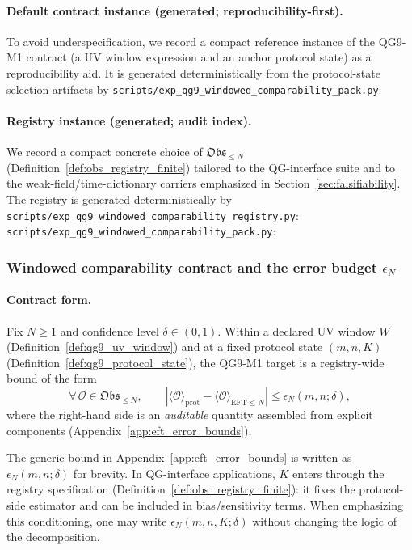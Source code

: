 \paragraph{Default contract instance (generated; reproducibility-first).}
\AuditTag To avoid underspecification, we record a compact reference instance of the QG9-M1 contract (a UV window expression and an anchor protocol state)
as a reproducibility aid. It is generated deterministically from the protocol-state selection artifacts by
\texttt{scripts/exp\_qg9\_windowed\_comparability\_pack.py}:


\paragraph{Registry instance (generated; audit index).}
\AuditTag We record a compact concrete choice of $\mathfrak{Obs}_{\le N}$ (Definition~\ref{def:obs_registry_finite}) tailored to the QG-interface suite
and to the weak-field/time-dictionary carriers emphasized in Section~\ref{sec:falsifiability}.
The registry is generated deterministically by \texttt{scripts/exp\_qg9\_windowed\_comparability\_registry.py}:
\texttt{scripts/exp\_qg9\_windowed\_comparability\_pack.py}:


\subsubsection{Windowed comparability contract and the error budget \texorpdfstring{$\epsilon_N$}{epsilonN}}
\label{subsec:qg9_m1_contract}

\paragraph{Contract form.}
\MathTag Fix $N\ge 1$ and confidence level $\delta\in(0,1)$.
Within a declared UV window $W$ (Definition~\ref{def:qg9_uv_window}) and at a fixed protocol state $(m,n,K)$
(Definition~\ref{def:qg9_protocol_state}), the QG9-M1 target is a registry-wide bound of the form
$$
\forall\,\mathcal{O}\in\mathfrak{Obs}_{\le N},\qquad
\left|\langle\mathcal{O}\rangle_{\mathrm{prot}}-\langle\mathcal{O}\rangle_{\mathrm{EFT}\le N}\right|
\le \epsilon_N(m,n;\delta),
$$
where the right-hand side is an \emph{auditable} quantity assembled from explicit components (Appendix~\ref{app:eft_error_bounds}).

\begin{remark}\label{rem:qg9_kernel_in_epsilon}
\AuditTag The generic bound in Appendix~\ref{app:eft_error_bounds} is written as $\epsilon_N(m,n;\delta)$ for brevity.
In QG-interface applications, $K$ enters through the registry specification (Definition~\ref{def:obs_registry_finite}):
it fixes the protocol-side estimator and can be included in bias/sensitivity terms.
When emphasizing this conditioning, one may write $\epsilon_N(m,n,K;\delta)$ without changing the logic of the decomposition.
\end{remark}

